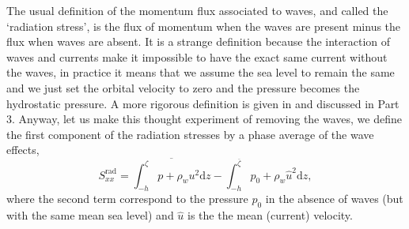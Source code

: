 The usual definition of the momentum flux associated to waves, and called the `radiation stress', is the 
flux of momentum when the waves are present minus the flux when waves are absent. It is a strange definition because the interaction of 
waves and currents make it impossible to have the exact same current without the waves, in practice it means 
that we assume the sea level to remain the same and we just set the orbital velocity to zero and the pressure becomes the hydrostatic pressure. 
A more rigorous definition is given in \cite{Andrews&McIntyre1978b}
and discussed in Part 3. Anyway, let us make this thought experiment of  removing the waves, 
 we define the first component of the radiation stresses by a phase average of the wave effects, 
\begin{equation}
    S^{\mathrm{rad}}_{xx}=\overline{ \int_{-h}^\zeta p + \rho_w u^2 \mathrm{d}z }
    -\int_{-h}^{\overline{\zeta}} p_0 + \rho_w \widehat{u}^2   \mathrm{d}z,
\end{equation}
where the second term correspond to the pressure $p_0$ in the absence of waves (but with the same mean sea level) and $\widehat{u}$ is the 
the mean (current) velocity. 

